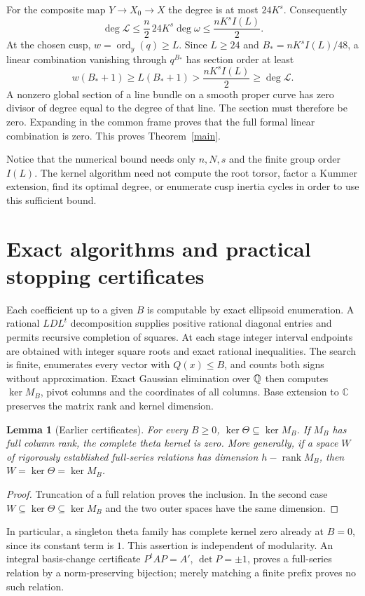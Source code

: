\documentclass[11pt]{article}
\newtheorem{lemma}[theorem]{Lemma}
\theoremstyle{remark}\newtheorem{remark}[theorem]{Remark}
\newcommand{\C}{\mathbb C}\newcommand{\OO}{\mathcal O}
\DeclareMathOperator{\ord}{ord}\DeclareMathOperator{\diag}{diag}
\DeclareMathOperator{\rank}{rank}\DeclareMathOperator{\divisor}{div}
\begin{document}
For the composite map $Y\to X_0\to X$ the degree is at most $24K^s$.
Consequently
\[
 \deg\mathcal L\leq\frac n2\,24K^s\deg\omega
       \leq\frac{nK^sI(L)}2.
\]
At the chosen cusp, $w=\ord_y(q)\geq L$. Since $L\geq24$ and
$B_*=nK^sI(L)/48$, a linear combination vanishing through $q^{B_*}$
has section order at least
\[
 w(B_*+1)\geq L(B_*+1)
 >\frac{nK^sI(L)}2\geq\deg\mathcal L.
\]
A nonzero global section of a line bundle on a smooth proper curve has
zero divisor of degree equal to the degree of that line. The section must
therefore be zero. Expanding in the common frame proves that the full
formal linear combination is zero. This proves Theorem~\ref{main}.

Notice that the numerical bound needs only $n,N,s$ and the finite group
order $I(L)$. The kernel algorithm need not compute the root torsor,
factor a Kummer extension, find its optimal degree, or enumerate cusp
inertia cycles in order to use this sufficient bound.

\section{Exact algorithms and practical stopping certificates}
Each coefficient up to a given $B$ is computable by exact ellipsoid
enumeration. A rational $LDL^t$ decomposition supplies positive rational
diagonal entries and permits recursive completion of squares. At each
stage integer interval endpoints are obtained with integer square roots
and exact rational inequalities. The search is finite, enumerates every
vector with $Q(x)\leq B$, and counts both signs without approximation.
Exact Gaussian elimination over $\mathbb Q$ then computes $\ker M_B$, pivot
columns and the coordinates of all columns. Base extension to $\C$
preserves the matrix rank and kernel dimension.

\begin{lemma}[Earlier certificates]\label{early}
For every $B\geq0$, $\ker\Theta\subseteq\ker M_B$.
If $M_B$ has full column rank, the complete theta kernel is zero.
More generally, if a space $W$ of rigorously established full-series
relations has dimension $h-\rank M_B$, then
$W=\ker\Theta=\ker M_B$.
\end{lemma}
\begin{proof}
Truncation of a full relation proves the inclusion. In the second case
$W\subseteq\ker\Theta\subseteq\ker M_B$ and the two outer spaces have
the same dimension.
\end{proof}

In particular, a singleton theta family has complete kernel zero already
at $B=0$, since its constant term is $1$. This assertion is independent of
modularity. An integral basis-change certificate
$P^tAP=A'$, $\det P=\pm1$, proves a full-series relation by a norm-preserving
bijection; merely matching a finite prefix proves no such relation.
\end{document}
